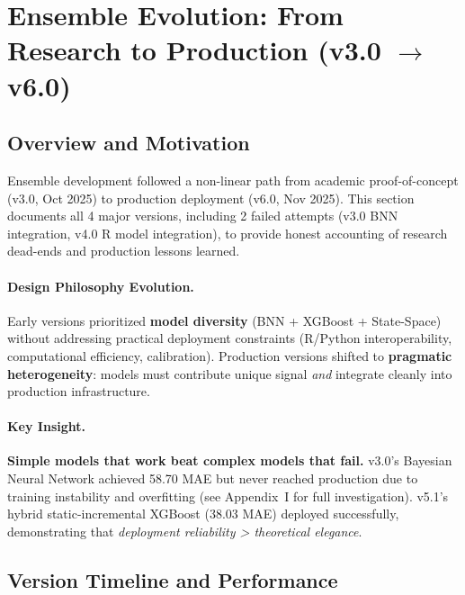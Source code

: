 
\section{Ensemble Evolution: From Research to Production (v3.0 $\to$ v6.0)}
\label{sec:ensemble-evolution}

\subsection{Overview and Motivation}

Ensemble development followed a non-linear path from academic proof-of-concept (v3.0, Oct 2025) to production deployment (v6.0, Nov 2025). This section documents all 4 major versions, including 2 failed attempts (v3.0 BNN integration, v4.0 R model integration), to provide honest accounting of research dead-ends and production lessons learned.

\paragraph{Design Philosophy Evolution.}
Early versions prioritized \textbf{model diversity} (BNN + XGBoost + State-Space) without addressing practical deployment constraints (R/Python interoperability, computational efficiency, calibration). Production versions shifted to \textbf{pragmatic heterogeneity}: models must contribute unique signal \textit{and} integrate cleanly into production infrastructure.

\paragraph{Key Insight.}
\textbf{Simple models that work beat complex models that fail.} v3.0's Bayesian Neural Network achieved 58.70 MAE but never reached production due to training instability and overfitting (see Appendix~I for full investigation). v5.1's hybrid static-incremental XGBoost (38.03 MAE) deployed successfully, demonstrating that \textit{deployment reliability > theoretical elegance}.

\subsection{Version Timeline and Performance}

